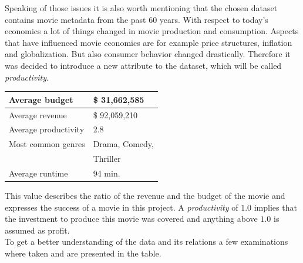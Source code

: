Speaking of those issues it is also worth mentioning that the chosen dataset contains movie metadata from the past 60 years. With respect to today's economics a lot of things changed in movie production and consumption. Aspects that have influenced movie economics are for example price structures, inflation and globalization. But also consumer behavior changed drastically. Therefore it was decided to introduce a new attribute to the dataset, which will be called \textit{productivity}. 
\begin{table}
	\begin{tabular}{| l | l |}
	\hline
	Average budget & \$ 31,662,585 \\ \hline
	Average revenue & \$ 92,059,210 \\ \hline
	Average productivity & 2.8 \\ \hline
	Most common genres & Drama, Comedy,\\ & Thriller \\ \hline
	Average runtime & 94 min. \\ \hline
	\end{tabular}
\end{table} 
This value describes the ratio of the revenue and the budget of the movie and expresses the success of a movie in this project. A \textit{productivity} of $1.0$ implies that the investment to produce this movie was covered and anything above $1.0$ is assumed as profit.
\\
To get a better understanding of the data and its relations a few examinations where taken and are presented in the table.
